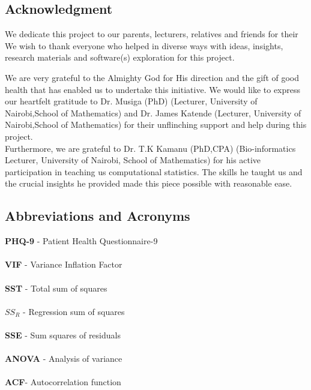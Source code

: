 \documentclass{article}
\numberwithin{equation}{section}
\begin{document}
	\newpage
	
	\subsection{Acknowledgment}
	We dedicate this project to our parents, lecturers, relatives and friends for their We wish to thank everyone who helped in diverse ways with ideas, insights, research materials and software(s) exploration for this project.
	
	\noindent We are very grateful to the Almighty God for His direction and the gift of good health that has enabled us to undertake this initiative. We would like to express our heartfelt gratitude to Dr. Musiga (PhD) (Lecturer, University of Nairobi,School of Mathematics) and Dr. James Katende (Lecturer, University of Nairobi,School of Mathematics) for their unflinching support and help during this project.\\
	Furthermore, we are grateful to Dr. T.K Kamanu (PhD,CPA) (Bio-informatics Lecturer, University of Nairobi, School of Mathematics) for his active participation in teaching us computational statistics. The skills he taught us and the crucial insights he provided made this piece possible with reasonable ease. 
	
	\newpage
	\subsection{Abbreviations and Acronyms}
	\textbf{PHQ-9} - Patient Health Questionnaire-9 \\\\
	\textbf{VIF} - Variance Inflation Factor\\\\
	\textbf{SST} - Total sum of squares \\\\
	\textbf{$SS_{R}$} - Regression sum of squares\\\\
	\textbf{SSE} - Sum squares of residuals \\\\
	\textbf{ANOVA} - Analysis of variance\\\\
	\textbf{ACF}- Autocorrelation function 
	
	\newpage
	
\end{document}
